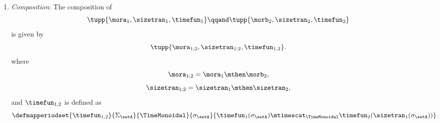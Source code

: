 \begin{definition}
\begin{enumerate}
        \item \emph{Composition}: The composition of
              \begin{equation}
                  \tupp{\mora_1, \sizetran_1,  \timefun_1  }
                  \qqand
                  \tupp{\morb_2, \sizetran_2,  \timefun_2  }
              \end{equation}
              is given by
              \begin{equation}
                  \tupp{
                      \mora_{1;2},
                      \sizetran_{1;2},
                      \timefun_{1,2}
                  }.
              \end{equation}
              where
              \begin{equation}
                  \mora_{1;2} = \mora_1 \mthen \morb_2,
              \end{equation}
              \begin{equation}
                  \sizetran_{1;2} = \sizetran_1 \mthen \sizetran_2,
              \end{equation}
              and $\timefun_{1,2}$ is defined as
              \begin{equation}
                  \defmapperiodset{
                      \timefun_{1,2}
                  }{
                      \Sigma_{\setA}
                  }{
                      \TimeMonoidal
                  }{
                      \sigma_{\setA}
                  }{
                      \timefun_1(\sigma_{\setA}) \mtimescat_{\TimeMonoidal} \timefun_2(\sizetran_1(\sigma_{\setA}))
                  }
              \end{equation}
    \end{enumerate}
\end{definition}

